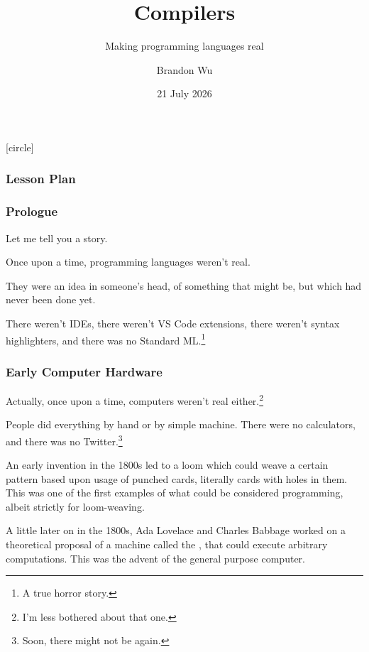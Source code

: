 \documentclass[aspectratio=169]{beamer}
\title{Compilers} %
\subtitle{Making programming languages real} %
\date{21 July 2026} %
\author{Brandon Wu} %
\newif\ifcolorlambda
\begin{document}
\ifweb
    \renewcommand{\pause}{}
\fi

[circle]

{
\begin{frame}[plain]
    \colorlambdatrue
    \titlepage
\end{frame}
}

\begin{frame}[fragile]
  \frametitle{Lesson Plan}

  \tableofcontents
\end{frame}


\begin{frame}[fragile]
  \frametitle{Prologue}

  Let me tell you a story.

  \pause
  \vspace{\fill}

  Once upon a time, programming languages weren't real.

  \pause
  \vspace{\fill}

  They were an idea in someone's head, of something that might be, but
  which had never been done yet.

  \pause
  \vspace{\fill}

  There weren't IDEs, there weren't VS Code extensions, there weren't
  syntax highlighters, and there was no Standard ML.\footnote<4->{A true horror story.}
\end{frame}

\begin{frame}[fragile]
  \frametitle{Early Computer Hardware}

  Actually, once upon a time, computers weren't real either.\footnote<1->{I'm less bothered about that one.}

  \pause
  \vspace{\fill}

  People did everything by hand or by simple machine. There were no calculators,
  and there was no Twitter.\footnote<2->{Soon, there might not be again.}

  \pause
  \vspace{\fill}

  An early invention in the 1800s led to a loom which could weave a certain pattern
  based upon usage of punched cards, literally cards with holes in them. This was
  one of the first examples of what could be considered programming, albeit
  strictly for loom-weaving.

  \pause
  \vspace{\fill}

  A little later on in the 1800s, Ada Lovelace and Charles Babbage worked on a
  theoretical proposal of a machine called the , that
  could execute arbitrary computations. This was the advent of the general
  purpose computer.
\end{frame}
\end{document}
